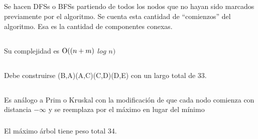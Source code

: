 \subsection{}
Se hacen DFSs o BFSs partiendo de todos los nodos que no hayan sido marcados previamente por el algoritmo. Se cuenta esta cantidad de ``comienzos'' del algoritmo. Esa es la cantidad de componentes conexas.

\subsection{}
\subsubsection{}
Su complejidad es $\operatorname{O}((n + m)$ $log$ $n)$

\setcounter{subsection}{19}
\subsection{}
Debe construirse (B,A)(A,C)(C,D)(D,E) con un largo total de 33.

\subsection{}

\subsubsection{}
Es análogo a Prim o Kruskal con la modificación de que cada nodo comienza con distancia $-\infty$ y se reemplaza por el máximo en lugar del mínimo

\subsubsection{}
El máximo árbol tiene peso total 34.